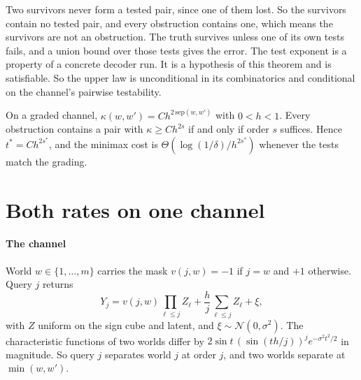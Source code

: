 
Two survivors never form a tested pair, since one of them lost. So the survivors contain no
tested pair, and every obstruction contains one, which means the survivors are not an
obstruction. The truth survives unless one of its own tests fails, and a union bound over those
tests gives the error. The test exponent is a property of a concrete decoder run. It is a
hypothesis of this theorem and is satisfiable. So the upper law is unconditional in its
combinatorics and conditional on the channel's pairwise testability.

\begin{theorem}
\label{thm:order}
On a graded channel, $\kappa(w,w')=Ch^{2\,\mathrm{sep}(w,w')}$ with $0<h<1$. Every obstruction
contains a pair with $\kappa\ge Ch^{2s}$ if and only if order $s$ suffices. Hence
$t^{*}=Ch^{2s^{*}}$, and the minimax cost is $\Theta(\log(1/\delta)/h^{2s^{*}})$ whenever the
tests match the grading.
\end{theorem}


\section{Both rates on one channel}
\label{sec:parity}

\paragraph{The channel} World $w\in\{1,\dots,m\}$ carries the mask $v(j,w)=-1$ if $j=w$ and $+1$
otherwise. Query $j$ returns
\[
Y_{j}=v(j,w)\prod_{\ell\le j}Z_{\ell}+\frac hj\sum_{\ell\le j}Z_{\ell}+\xi,
\]
with $Z$ uniform on the sign cube and latent, and $\xi\sim\mathcal N(0,\sigma^{2})$. The
characteristic functions of two worlds differ by $2\sin t\,(\sin(th/j))^{j}e^{-\sigma^{2}t^{2}/2}$
in magnitude. So query $j$ separates world $j$ at order $j$, and two worlds separate at
$\min(w,w')$.


